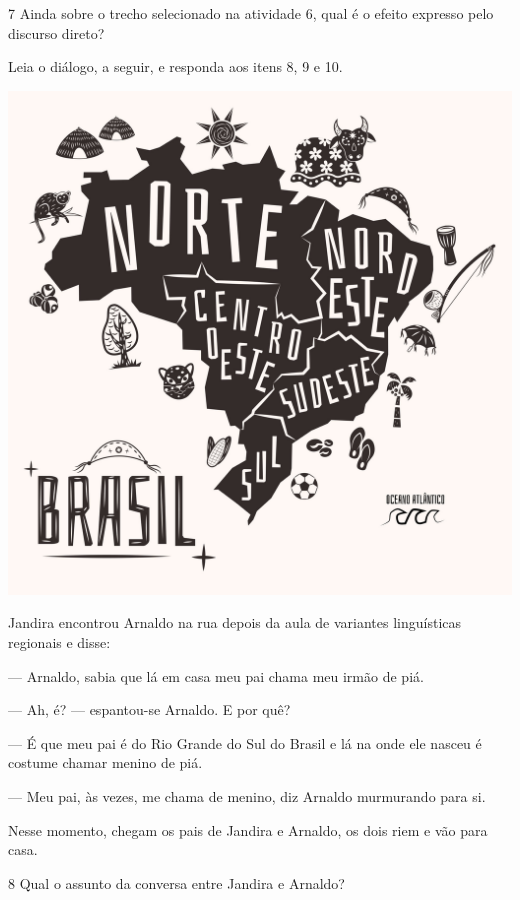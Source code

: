 \num{7} Ainda sobre o trecho selecionado na atividade 6, qual é o efeito expresso pelo discurso direto?


Leia o diálogo, a seguir, e responda aos itens 8, 9 e 10.

\begin{myquote}
\begin{center}
\includegraphics[width=.8\textwidth]{./media/image19c.jpeg}
\end{center}

Jandira encontrou Arnaldo na rua depois da aula de variantes linguísticas regionais 
e disse:

--- Arnaldo, sabia que lá em casa meu pai chama meu irmão de piá.

--- Ah, é? --- espantou-se Arnaldo. E por quê?

--- É que meu pai é do Rio Grande do Sul do Brasil 
e lá na onde ele nasceu é costume chamar menino de piá.

--- Meu pai, às vezes, me chama de menino, 
diz Arnaldo murmurando para si.

Nesse momento, chegam os pais de Jandira e Arnaldo, os dois riem e vão para casa.   

\end{myquote}

\num{8} Qual o assunto da conversa entre Jandira e Arnaldo? 

